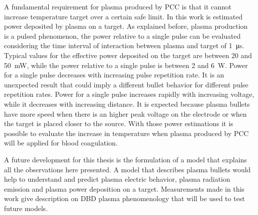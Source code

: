 A fundamental requirement for plasma produced by PCC is that it cannot increase temperature target over a certain safe limit. In this work is estimated power deposited by plasma on a target. As explained before, plasma production is a pulsed phenomenon, the power relative to a single pulse can be evaluated considering the time interval of interaction between plasma and target of \SI{1}{\micro\second}.
Typical values for the effective power deposited on the target are between \num{20} and \SI{50}{\milli\watt}, while the power relative to a single pulse is between \num{2} and \SI{6}{\watt}.
Power for a single pulse decreases with increasing pulse repetition rate. It is an unexpected result that could imply a different bullet behavior for different pulse repetition rates.
Power for a single pulse increases rapidly with increasing voltage, while it decreases with increasing distance. It is expected because plasma bullets have more speed when there is an higher peak voltage on the electrode or when the target is placed closer to the source.
With those power estimations it is possible to evaluate the increase in temperature when plasma produced by PCC will be applied for blood coagulation.


A future development for this thesis is the formulation of a model that explains all the observations here presented. A model that describes plasma bullets would help to understand and predict plasma electric behavior, plasma radiation emission and plasma power deposition on a target. Measurements made in this work give description on DBD plasma phenomenology that will be used to test future models.
